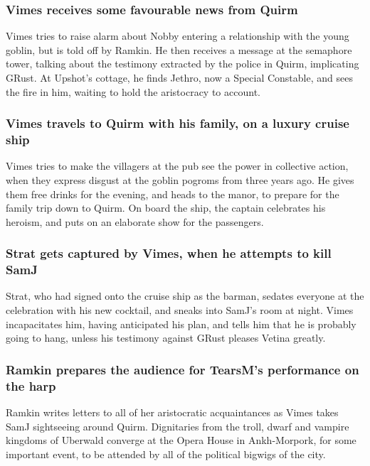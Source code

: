 \subsubsection{\Gls{Vimes} receives some favourable news from Quirm}
\Gls{Vimes} tries to raise alarm about \Gls{Nobby} entering a relationship with the young goblin,
but is told off by \Gls{Ramkin}. He then receives a message at the semaphore tower, talking about
the testimony extracted by the police in Quirm, implicating \Gls{GRust}. At \Gls{Upshot}'s cottage,
he finds \Gls{Jethro}, now a Special Constable, and sees the fire in him, waiting to hold the
aristocracy to account.

\subsubsection{\Gls{Vimes} travels to Quirm with his family, on a luxury cruise ship}
\Gls{Vimes} tries to make the villagers at the pub see the power in collective action, when they
express disgust at the goblin pogroms from three years ago. He gives them free drinks for the
evening, and heads to the manor, to prepare for the family trip down to Quirm. On board the ship,
the captain celebrates his heroism, and puts on an elaborate show for the passengers.

\subsubsection{\Gls{Strat} gets captured by \Gls{Vimes}, when he attempts to kill \Gls{SamJ}}
\Gls{Strat}, who had signed onto the cruise ship as the barman, sedates everyone at the celebration
with his new cocktail, and sneaks into \Gls{SamJ}'s room at night. \Gls{Vimes} incapacitates him,
having anticipated his plan, and tells him that he is probably going to hang, unless his testimony
against \Gls{GRust} pleases \Gls{Vetina} greatly.

\subsubsection{\Gls{Ramkin} prepares the audience for \Gls{TearsM}'s performance on the harp}
\Gls{Ramkin} writes letters to all of her aristocratic acquaintances as \Gls{Vimes} takes \Gls{SamJ}
sightseeing around Quirm. Dignitaries from the troll, dwarf and vampire kingdoms of Uberwald
converge at the Opera House in Ankh-Morpork, for some important event, to be attended by all of the
political bigwigs of the city.

